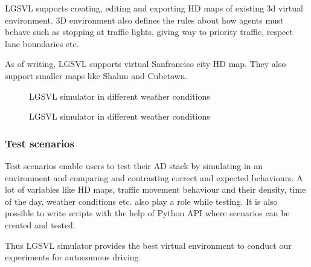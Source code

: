 LGSVL supports creating, editing and exporting HD maps of existing 3d virtual environment.
3D environment also defines the rules about how agents must behave such as stopping at traffic
lights, giving way to priority traffic, respect lane boundaries etc.

As of writing, LGSVL supports virtual Sanfranciso city HD map. They also support smaller
maps like Shalun and Cubetown.

\begin{figure}[h]
    \centering
    \def\svgwidth{\textwidth}
    
    \caption{LGSVL simulator in different weather conditions}
    \label{fig:weatherconditions1}
\end{figure}

\begin{figure}[h]
    \centering
    \def\svgwidth{\textwidth}
    
    \caption{LGSVL simulator in different weather conditions}
    \label{fig:weatherconditions}
\end{figure}

\subsubsection*{Test scenarios}
Test scenarios enable users to test their AD stack by simulating in an environment and
comparing and contrasting correct and expected behaviours. A lot of variables like HD maps,
traffic movement behaviour and their density, time of the day, weather conditions etc. also
play a role while testing. It is also possible to write scripts with the help of Python
API where scenarios can be created and tested.

Thus LGSVL simulator \cite{rong2020lgsvl} provides the best virtual environment to conduct our experiments for
autonomous driving.
